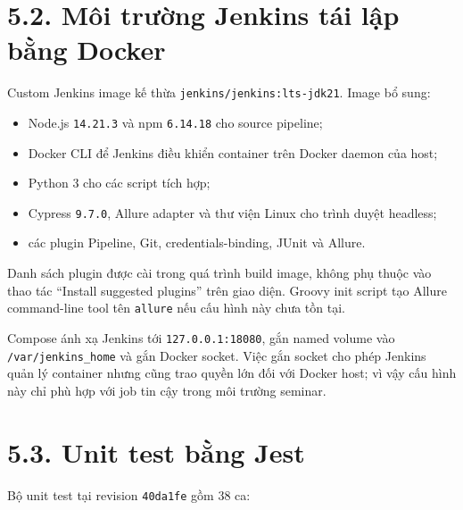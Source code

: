 \documentclass[
  vietnamese,
  12pt,
  a4paper,
  oneside]{report}
\providecommand{\tightlist}{%
  \setlength{\itemsep}{0pt}\setlength{\parskip}{0pt}}
\begin{document}
\section{5.2. Môi trường Jenkins tái lập bằng
Docker}\label{52-muxf4i-trux1b0ux1eddng-jenkins-tuxe1i-lux1eadp-bux1eb1ng-docker}

Custom Jenkins image kế thừa \texttt{jenkins/jenkins:lts-jdk21}. Image
bổ sung:

\begin{itemize}
\tightlist
\item
  Node.js \texttt{14.21.3} và npm \texttt{6.14.18} cho source pipeline;
\item
  Docker CLI để Jenkins điều khiển container trên Docker daemon của
  host;
\item
  Python 3 cho các script tích hợp;
\item
  Cypress \texttt{9.7.0}, Allure adapter và thư viện Linux cho trình
  duyệt headless;
\item
  các plugin Pipeline, Git, credentials-binding, JUnit và Allure.
\end{itemize}

Danh sách plugin được cài trong quá trình build image, không phụ thuộc
vào thao tác ``Install suggested plugins'' trên giao diện. Groovy init
script tạo Allure command-line tool tên \texttt{allure} nếu cấu hình này
chưa tồn tại.

Compose ánh xạ Jenkins tới \texttt{127.0.0.1:18080}, gắn named volume
vào \texttt{/var/jenkins\_home} và gắn Docker socket. Việc gắn socket
cho phép Jenkins quản lý container nhưng cũng trao quyền lớn đối với
Docker host; vì vậy cấu hình này chỉ phù hợp với job tin cậy trong môi
trường seminar.

\section{5.3. Unit test bằng Jest}\label{53-unit-test-bux1eb1ng-jest}

Bộ unit test tại revision \texttt{40da1fe} gồm 38 ca:
\end{document}
